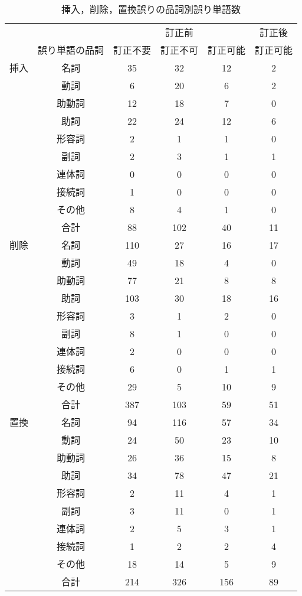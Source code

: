 \begin{table}
\begin{center}
\caption{挿入，削除，置換誤りの品詞別誤り単語数}
\label{JE-closed-recog-pos}
\begin{tabular}{|c|c||c|c|c||c|} \hline
 & & \multicolumn{3}{c||}{訂正前} & \multicolumn{1}{c|}{訂正後}\\ \cline{3-6}
& 誤り単語の品詞 & 訂正不要 & 訂正不可 & 訂正可能 & 訂正可能 \\ \hline\hline
挿入 
& 名詞 & 35 & 32 & 12 & 2 \\ \cline{2-6}
& 動詞 & 6 & 20 & 6 & 2 \\ \cline{2-6}
& 助動詞 & 12 & 18 & 7 & 0 \\ \cline{2-6}
& 助詞 & 22 & 24 & 12 & 6 \\ \cline{2-6}
& 形容詞 & 2 & 1 & 1 & 0 \\ \cline{2-6}
& 副詞 & 2 & 3 & 1 & 1 \\ \cline{2-6}
& 連体詞 & 0 & 0 & 0 & 0 \\ \cline{2-6}
& 接続詞 & 1 & 0 & 0 & 0 \\ \cline{2-6}
& その他 & 8 & 4 & 1 & 0 \\ \cline{2-6}
& 合計 & 88 & 102 & 40 & 11 \\ \hline\hline
削除
& 名詞 & 110 & 27 & 16 & 17 \\ \cline{2-6}
& 動詞 & 49 & 18 & 4 & 0 \\ \cline{2-6}
& 助動詞 & 77 & 21 & 8 & 8 \\ \cline{2-6}
& 助詞 & 103 & 30 & 18 & 16 \\ \cline{2-6}
& 形容詞 & 3 & 1 & 2 & 0 \\ \cline{2-6}
& 副詞 & 8 & 1 & 0 & 0 \\ \cline{2-6}
& 連体詞 & 2 & 0 & 0 & 0 \\ \cline{2-6}
& 接続詞 & 6 & 0 & 1 & 1 \\ \cline{2-6}
& その他 & 29 & 5 & 10 & 9 \\ \cline{2-6}
& 合計 & 387 & 103 & 59 & 51 \\ \hline\hline
置換
& 名詞 & 94 & 116 & 57 & 34 \\ \cline{2-6}
& 動詞 & 24 & 50 & 23 & 10 \\ \cline{2-6}
& 助動詞 & 26 & 36 & 15 & 8 \\ \cline{2-6}
& 助詞 & 34 & 78 & 47 & 21 \\ \cline{2-6}
& 形容詞 & 2 & 11 & 4 & 1 \\ \cline{2-6}
& 副詞 & 3 & 11 & 0 & 1 \\ \cline{2-6}
& 連体詞 & 2 & 5 & 3 & 1 \\ \cline{2-6}
& 接続詞 & 1 & 2 & 2 & 4 \\ \cline{2-6}
& その他 & 18 & 14 & 5 & 9 \\ \cline{2-6}
& 合計 & 214 & 326 & 156 & 89 \\ \hline
\end{tabular}
\end{center}
\end{table}

